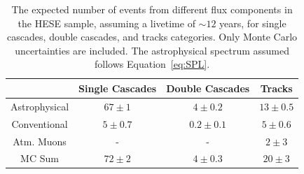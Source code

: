\begin{table}[h]
    \caption[The expected number of events in 12 years of HESE data]{The expected number of events from different flux components in the HESE sample, assuming a livetime of $\sim 12$ years, for single cascades, double cascades, and tracks categories. Only Monte Carlo uncertainties are included. The astrophysical spectrum assumed follows Equation~\ref{eq:SPL}.}
    
    \begin{tabular}{ c |c|c|c}
        
        \hline
        &Single Cascades &Double Cascades&Tracks\\
        \hline
        \hline
        Astrophysical&$67\pm1$& $4\pm0.2$ & $13\pm0.5$\\
        Conventional & $5\pm0.7$& $0.2\pm0.1$ &$5\pm0.6$\\
        Atm. Muons & - & - & $2\pm3$\\
        \hline
        MC Sum & $72\pm2$ & $4\pm0.3$ & $20\pm3$\\
        \hline
    \end{tabular}
\end{table}

